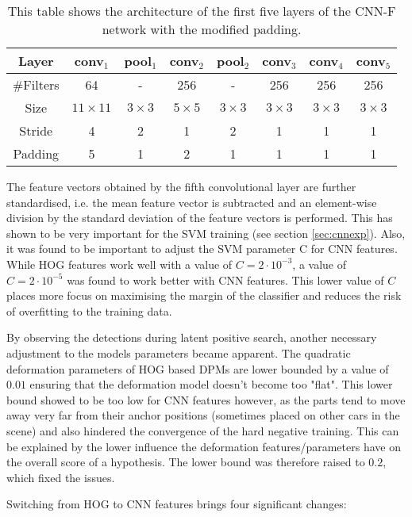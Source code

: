 \begin{table}
\begin{center}
\begin{tabular}{|c||c|c|c|c|c|c|c|}
\hline
Layer & conv$_1$ & pool$_1$ &  conv$_2$ & pool$_2$ & conv$_3$ & conv$_4$ & conv$_5$ \\
\hline \hline
\#Filters & 64 & - & 256 & -& 256 &  256 &  256 \\
\hline
Size	& $11\times11$ & $3\times3$ & $5\times5$ & $3\times3$ &  $3\times3$ &  $3\times3$ &  $3\times3$  \\
\hline
Stride & 4 & 2 & 1 & 2 & 1 & 1 & 1\\ 
\hline
Padding & 5 & 1 & 2 & 1 & 1 & 1 & 1\\
\hline
\end{tabular}
\caption{This table shows the architecture of the first five layers of  the CNN-F network with the modified padding.}
\label{tab:cnn}
\end{center}
\end{table}

The feature vectors obtained by the fifth convolutional layer are further standardised, i.e. the mean feature vector is subtracted and an element-wise division by the standard deviation of the feature vectors is performed. This has shown to be very important for the SVM training (see section \ref{sec:cnnexp}). Also, it was found  to be important to adjust the SVM parameter C for CNN features. While HOG features work well with a value of $C=2\cdot10^{-3}$, a value of $C=2\cdot10^{-5}$ was found to work better with CNN features. This lower value of $C$ places more focus on maximising the margin of the classifier and reduces the risk of overfitting to the training data.

By observing the detections during latent positive search, another necessary adjustment to the models parameters became apparent. The quadratic deformation parameters of HOG based DPMs are lower bounded by a value of $0.01$ ensuring that the deformation model doesn't become too "flat". This lower bound showed to be too low for CNN features however, as the parts tend to move away very far from their anchor positions (sometimes placed on other cars in the scene) and also hindered the convergence of the hard negative training. This can be explained by the lower influence the deformation features/parameters have on the overall score of a hypothesis. The lower bound was therefore raised to $0.2$, which fixed the issues.

Switching from HOG to CNN features brings four significant changes: 

